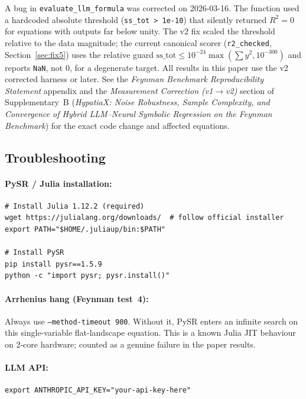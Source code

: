 \documentclass[twoside,11pt]{article}
\begin{document}
A bug in \texttt{evaluate\_llm\_formula} was corrected on 2026-03-16.
The function used a hardcoded absolute threshold (\texttt{ss\_tot > 1e-10})
that silently returned $R^2=0$ for equations with outputs far below unity.
The v2 fix scaled the threshold relative to the data magnitude; the current
canonical scorer (\texttt{r2\_checked}, Section~\ref{sec:fix5}) uses the relative
guard $\mathrm{ss\_tot} \le 10^{-24}\max(\sum y^2, 10^{-300})$ and reports
\texttt{NaN}, not $0$, for a degenerate target.
All results in this paper use the v2 corrected harness or later.
See the \emph{Feynman Benchmark Reproducibility Statement} appendix and the
\emph{Measurement Correction (v1$\to$v2)} section of Supplementary~B
(\emph{HypatiaX: Noise Robustness, Sample Complexity, and Convergence of
Hybrid LLM--Neural Symbolic Regression on the Feynman Benchmark}) for the
exact code change and affected equations.

\subsection{Troubleshooting}

\paragraph{PySR / Julia installation:}
\begin{small}
\begin{verbatim}
# Install Julia 1.12.2 (required)
wget https://julialang.org/downloads/  # follow official installer
export PATH="$HOME/.juliaup/bin:$PATH"

# Install PySR
pip install pysr==1.5.9
python -c "import pysr; pysr.install()"
\end{verbatim}
\end{small}

\paragraph{Arrhenius hang (Feynman test~4):}
Always use \texttt{--method-timeout 900}. Without it, PySR enters an
infinite search on this single-variable flat-landscape equation.
This is a known Julia JIT behaviour on 2-core hardware; counted as a
genuine failure in the paper results.

\paragraph{LLM API:}
\begin{small}
\begin{verbatim}
export ANTHROPIC_API_KEY="your-api-key-here"
\end{verbatim}
\end{small}
\end{document}
